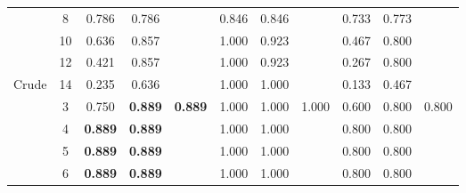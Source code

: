 \begin{table}[]
\begin{tabular}{|c|c|c|c|c|c|c|c|c|c|c|}
                        & 8                     & \cellcolor[HTML]{EFEFEF}0.786          & \cellcolor[HTML]{EFEFEF}0.786          & \cellcolor[HTML]{EFEFEF}               & 0.846    & 0.846    &          & \cellcolor[HTML]{EFEFEF}0.733 & \cellcolor[HTML]{EFEFEF}0.773 & \cellcolor[HTML]{EFEFEF}      \\ \cline{2-11} 
                        & 10                    & \cellcolor[HTML]{EFEFEF}0.636          & \cellcolor[HTML]{EFEFEF}0.857          & \cellcolor[HTML]{EFEFEF}               & 1.000    & 0.923    &          & \cellcolor[HTML]{EFEFEF}0.467 & \cellcolor[HTML]{EFEFEF}0.800 & \cellcolor[HTML]{EFEFEF}      \\ \cline{2-11} 
                        & 12                    & \cellcolor[HTML]{EFEFEF}0.421          & \cellcolor[HTML]{EFEFEF}0.857          & \cellcolor[HTML]{EFEFEF}               & 1.000    & 0.923    &          & \cellcolor[HTML]{EFEFEF}0.267 & \cellcolor[HTML]{EFEFEF}0.800 & \cellcolor[HTML]{EFEFEF}      \\ \cline{2-11} 
\multirow{-9}{*}{Crude} & 14                    & \cellcolor[HTML]{EFEFEF}0.235          & \cellcolor[HTML]{EFEFEF}0.636          & \cellcolor[HTML]{EFEFEF}               & 1.000    & 1.000    &          & \cellcolor[HTML]{EFEFEF}0.133 & \cellcolor[HTML]{EFEFEF}0.467 & \cellcolor[HTML]{EFEFEF}      \\ \hline
                        & 3                     & \cellcolor[HTML]{EFEFEF}0.750          & \cellcolor[HTML]{EFEFEF}\textbf{0.889} & \cellcolor[HTML]{EFEFEF}\textbf{0.889} & 1.000    & 1.000    & 1.000    & \cellcolor[HTML]{EFEFEF}0.600 & \cellcolor[HTML]{EFEFEF}0.800 & \cellcolor[HTML]{EFEFEF}0.800 \\ \cline{2-11} 
                        & 4                     & \cellcolor[HTML]{EFEFEF}\textbf{0.889} & \cellcolor[HTML]{EFEFEF}\textbf{0.889} & \cellcolor[HTML]{EFEFEF}               & 1.000    & 1.000    &          & \cellcolor[HTML]{EFEFEF}0.800 & \cellcolor[HTML]{EFEFEF}0.800 & \cellcolor[HTML]{EFEFEF}      \\ \cline{2-11} 
                        & 5                     & \cellcolor[HTML]{EFEFEF}\textbf{0.889} & \cellcolor[HTML]{EFEFEF}\textbf{0.889} & \cellcolor[HTML]{EFEFEF}               & 1.000    & 1.000    &          & \cellcolor[HTML]{EFEFEF}0.800 & \cellcolor[HTML]{EFEFEF}0.800 & \cellcolor[HTML]{EFEFEF}      \\ \cline{2-11} 
                        & 6                     & \cellcolor[HTML]{EFEFEF}\textbf{0.889} & \cellcolor[HTML]{EFEFEF}\textbf{0.889} & \cellcolor[HTML]{EFEFEF}               & 1.000    & 1.000    &          & \cellcolor[HTML]{EFEFEF}0.800 & \cellcolor[HTML]{EFEFEF}0.800 & \cellcolor[HTML]{EFEFEF}      \\ \cline{2-11} 

\end{tabular}
\end{table}
